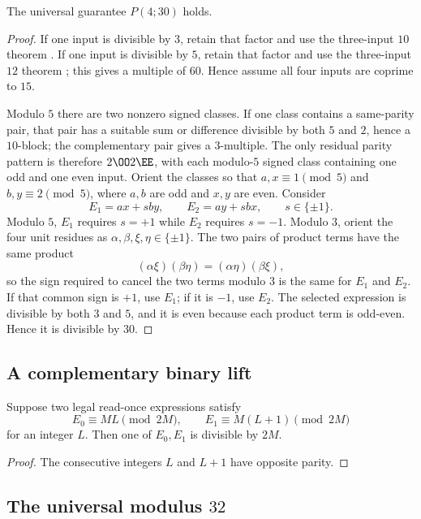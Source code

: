 \begin{theorem}\label{thm:p30}
The universal guarantee $P(4;30)$ holds.
\end{theorem}
\begin{proof}
If one input is divisible by $3$, retain that factor and use the three-input
$10$ theorem .  If one input is divisible by $5$, retain
that factor and use the three-input $12$ theorem ; this
gives a multiple of $60$.  Hence assume all four inputs are coprime to $15$.

Modulo $5$ there are two nonzero signed classes.  If one class contains a
same-parity pair, that pair has a suitable sum or difference divisible by
both $5$ and $2$, hence a $10$-block; the complementary pair gives a
$3$-multiple.  The only residual parity pattern is therefore $2\OO2\EE$,
with each modulo-$5$ signed class containing one odd and one even input.
Orient the classes so that $a,x\equiv1\pmod5$ and
$b,y\equiv2\pmod5$, where $a,b$ are odd and $x,y$ are even.  Consider
\[
 E_1=ax+sby,
 \qquad
 E_2=ay+sbx,
 \qquad s\in\{\pm1\}.
\]
Modulo $5$, $E_1$ requires $s=+1$ while $E_2$ requires $s=-1$.
Modulo $3$, orient the four unit residues as
$\alpha,\beta,\xi,\eta\in\{\pm1\}$.  The two pairs of product terms have the
same product
\[
 (\alpha\xi)(\beta\eta)=(\alpha\eta)(\beta\xi),
\]
so the sign required to cancel the two terms modulo $3$ is the same for
$E_1$ and $E_2$.  If that common sign is $+1$, use $E_1$; if it is $-1$, use
$E_2$.  The selected expression is divisible by both $3$ and $5$, and it is
even because each product term is odd-even.  Hence it is divisible by $30$.
\end{proof}

\subsection{A complementary binary lift}\label{app:binary-lift}

\begin{lemma}\label{lem:binary-lift}
Suppose two legal read-once expressions satisfy
\[
 E_0\equiv M L\pmod{2M},\qquad
 E_1\equiv M(L+1)\pmod{2M}
\]
for an integer $L$.  Then one of $E_0,E_1$ is divisible by $2M$.
\end{lemma}
\begin{proof}
The consecutive integers $L$ and $L+1$ have opposite parity.
\end{proof}

\subsection{\texorpdfstring{The universal modulus $32$}{The universal modulus 32}}\label{app:p32}

